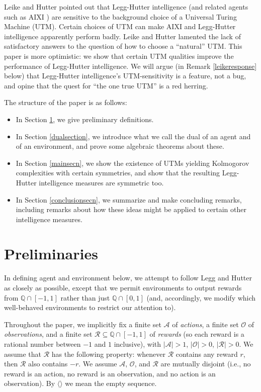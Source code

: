 \documentclass{article}
\begin{document}
Leike and Hutter \cite{leike2015bad} pointed out that Legg-Hutter intelligence
(and related agents such as AIXI \cite{hutter2004universal}) are sensitive
to the background choice of a Universal
Turing Machine (UTM). Certain choices of UTM can make AIXI and Legg-Hutter intelligence
apparently perform badly. Leike and Hutter lamented the lack of satisfactory answers to
the question of how to choose a ``natural'' UTM. This paper is more optimistic:
we show that certain UTM qualities improve the performance of Legg-Hutter
intelligence. We will argue (in Remark \ref{leikeresponse} below)
that Legg-Hutter intelligence's UTM-sensitivity is
a feature, not a bug, and opine that the quest for ``the one true UTM'' is
a red herring.

The structure of the paper is as follows:
\begin{itemize}
    \item In Section \ref{prelimsecn}, we give preliminary definitions.
    \item In Section \ref{dualsection}, we introduce what we call the dual of an agent and of
        an environment, and prove some algebraic theorems about these.
    \item In Section \ref{mainsecn}, we show the existence of UTMs yielding Kolmogorov
        complexities with certain symmetries, and show that the resulting Legg-Hutter
        intelligence measures are symmetric too.
    \item In Section \ref{conclusionsecn}, we summarize and make concluding remarks, including
        remarks about how these ideas might be applied to certain other intelligence measures.
\end{itemize}

\section{Preliminaries}
\label{prelimsecn}

In defining agent and environment below, we attempt to follow
Legg and Hutter \cite{legg2007universal} as closely as possible,
except that we permit environments to output rewards from $\mathbb Q \cap [-1,1]$
rather than just $\mathbb Q\cap [0,1]$ (and, accordingly, we modify which well-behaved
environments to restrict our attention to).

Throughout the paper, we implicitly
fix a finite set $\mathcal A$ of \emph{actions},
a finite set $\mathcal O$ of \emph{observations},
and a finite set $\mathcal R\subseteq \mathbb Q\cap [-1,1]$ of \emph{rewards}
(so each reward is a rational number between $-1$ and $1$ inclusive),
with $|\mathcal A|>1$,
$|\mathcal O|>0$, $|\mathcal R|>0$.
We assume that $\mathcal R$ has the following property:
whenever $\mathcal R$ contains any reward $r$, then $\mathcal R$
also contains $-r$.
We assume $\mathcal A$, $\mathcal O$, and $\mathcal R$ are mutually disjoint
(i.e., no reward is an action, no reward is an observation, and no action is an
observation).
By $\langle\rangle$ we mean the empty sequence.
\end{document}
